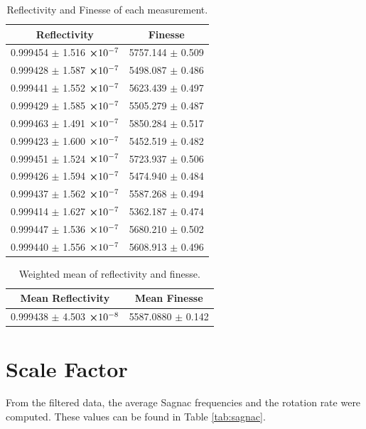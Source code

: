 \documentclass[a4paper]{report}
\numberwithin{equation}{section}
\begin{document}
\begin{table}[!ht]
    \centering
    \begin{tabular}{|c|c|}
    \hline
        Reflectivity & Finesse \\ \hline
        0.999454 $\pm$ 1.516 $\cross 10^{-7}$ & 5757.144 $\pm$ 0.509 \\ \hline
        0.999428 $\pm$ 1.587 $\cross 10^{-7}$ & 5498.087 $\pm$ 0.486 \\ \hline
        0.999441 $\pm$ 1.552 $\cross 10^{-7}$ & 5623.439 $\pm$ 0.497 \\ \hline
        0.999429 $\pm$ 1.585 $\cross 10^{-7}$ & 5505.279 $\pm$ 0.487 \\ \hline
        0.999463 $\pm$ 1.491 $\cross 10^{-7}$ & 5850.284 $\pm$ 0.517 \\ \hline
        0.999423 $\pm$ 1.600 $\cross 10^{-7}$ & 5452.519 $\pm$ 0.482 \\ \hline
        0.999451 $\pm$ 1.524 $\cross 10^{-7}$ & 5723.937 $\pm$ 0.506 \\ \hline
        0.999426 $\pm$ 1.594 $\cross 10^{-7}$ & 5474.940 $\pm$ 0.484 \\ \hline
        0.999437 $\pm$ 1.562 $\cross 10^{-7}$ & 5587.268 $\pm$ 0.494 \\ \hline
        0.999414 $\pm$ 1.627 $\cross 10^{-7}$ & 5362.187 $\pm$ 0.474 \\ \hline
        0.999447 $\pm$ 1.536 $\cross 10^{-7}$ & 5680.210 $\pm$ 0.502 \\ \hline
        0.999440 $\pm$ 1.556 $\cross 10^{-7}$ & 5608.913 $\pm$ 0.496 \\ \hline
    \end{tabular}
    \caption{Reflectivity and Finesse of each measurement.}
    \label{tab:ref-fin}
\end{table}


\begin{table}[!ht]
    \centering
    \begin{tabular}{|c|c|}
    \hline
        Mean Reflectivity & Mean Finesse \\ \hline
        0.999438 $\pm$ 4.503 $\cross 10^{-8}$ & 5587.0880 $\pm$ 0.142 \\ \hline
    \end{tabular}
    \caption{Weighted mean of reflectivity and finesse.}
    \label{tab:mean-ref}
\end{table}


\section{Scale Factor}
From the filtered data, the average Sagnac frequencies and the rotation rate were computed. These values can be found in Table \ref{tab:sagnac}. 
\end{document}
